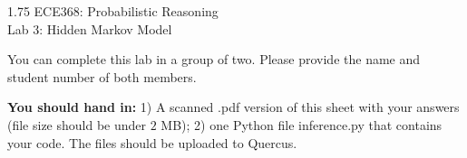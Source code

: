 \documentclass[twoside]{article}
\begin{document}
\begin{center}
\begin{spacing}{1.75}
{\Large { ECE368: Probabilistic Reasoning} \\
   {Lab 3: Hidden Markov Model}}
\end{spacing}
\vspace{-1em}
\end{center}

You can complete this lab in a group of two. Please provide the name and student number of both members.
\begin{center}
\end{center}
{\bf You should hand in:} 1) A scanned \textsf{.pdf} version of this sheet with your answers (file size
should be under $2$ MB); 2) one Python file \textsf{inference.py} that
contains your code. The files should be uploaded to Quercus.
\end{document}
